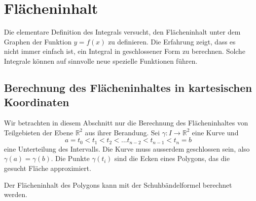 %
%
%
\section{Flächeninhalt
\label{buch:geometrie:section:flaeche}}
Die elementare Definition des Integrals versucht, den Flächeninhalt
unter dem Graphen der Funktion $y=f(x)$ zu definieren.
Die Erfahrung zeigt, dass es nicht immer einfach ist, ein Integral in
geschlossener Form zu berechnen.
Solche Integrale können auf sinnvolle neue spezielle Funktionen führen.

\subsection{Berechnung des Flächeninhaltes in kartesischen Koordinaten}
Wir betrachten in diesem Abschnitt nur die Berechnung des
Flächeninhaltes von Teilgebieten der Ebene $\mathbb{R}^2$
aus ihrer Berandung.
Sei $\gamma\colon I \to\mathbb{R}^2$ eine Kurve und 
\[
a=t_0<t_1<t_2<\dots t_{n-2}<t_{n-1}<t_n=b
\]
eine Unterteilung des Intervalls.
Die Kurve muss ausserdem geschlossen sein, also $\gamma(a)=\gamma(b)$.
Die Punkte $\gamma(t_i)$ sind die Ecken eines Polygons, das die gesucht
Fläche approximiert.

Der Flächeninhalt des Polygons kann mit der Schuhbändelformel
\cite[p.~184]{buch:linalg}
berechnet werden.

